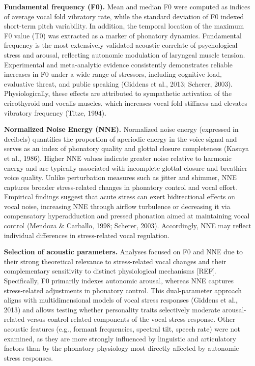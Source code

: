 \documentclass[
  english,
  man]{apa6}
\begin{document}
\textbf{Fundamental frequency (F0).} Mean and median F0 were computed as indices of average vocal fold vibratory rate, while the standard deviation of F0 indexed short-term pitch variability. In addition, the temporal location of the maximum F0 value (T0) was extracted as a marker of phonatory dynamics. Fundamental frequency is the most extensively validated acoustic correlate of psychological stress and arousal, reflecting autonomic modulation of laryngeal muscle tension. Experimental and meta-analytic evidence consistently demonstrates reliable increases in F0 under a wide range of stressors, including cognitive load, evaluative threat, and public speaking (Giddens
et al., 2013; Scherer, 2003). Physiologically, these effects are attributed to sympathetic activation of the cricothyroid and vocalis muscles, which increases vocal fold stiffness and elevates vibratory frequency (Titze, 1994).

\textbf{Normalized Noise Energy (NNE).} Normalized noise energy (expressed in decibels) quantifies the proportion of aperiodic energy in the voice signal and serves as an index of phonatory quality and glottal closure completeness (Kasuya et al., 1986). Higher NNE values indicate greater noise relative to harmonic energy and are typically associated with incomplete glottal closure and breathier voice quality. Unlike perturbation measures such as jitter and shimmer, NNE captures broader stress-related changes in phonatory control and vocal effort. Empirical findings suggest that acute stress can exert bidirectional effects on vocal noise, increasing NNE through airflow turbulence or decreasing it via compensatory hyperadduction and pressed phonation aimed at maintaining vocal control (Mendoza \& Carballo, 1998; Scherer, 2003). Accordingly, NNE may
reflect individual differences in stress-related vocal regulation.

\textbf{Selection of acoustic parameters.} Analyses focused on F0 and NNE due to their strong theoretical relevance to stress-related vocal changes and their complementary sensitivity to distinct physiological mechanisms {[}REF{]}. Specifically, F0 primarily indexes autonomic arousal, whereas NNE captures stress-related adjustments in phonatory control. This dual-parameter approach aligns with multidimensional models of vocal stress responses (Giddens et al., 2013) and allows testing whether personality traits selectively moderate arousal-related versus control-related components of the vocal stress response. Other acoustic features (e.g., formant frequencies, spectral tilt, speech rate) were not examined, as they are more strongly influenced by linguistic and articulatory factors than by the phonatory physiology most directly affected by autonomic stress responses.
\end{document}
